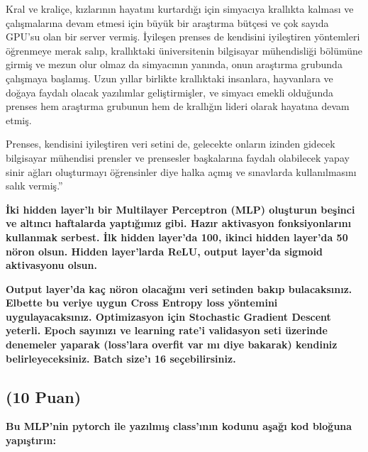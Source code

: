 \documentclass[11pt]{article}
\begin{document}
Kral ve kraliçe, kızlarının hayatını kurtardığı için simyacıya krallıkta kalması ve çalışmalarına devam etmesi için büyük bir araştırma bütçesi ve çok sayıda GPU'su olan bir server vermiş. İyileşen prenses de kendisini iyileştiren yöntemleri öğrenmeye merak salıp, krallıktaki üniversitenin bilgisayar mühendisliği bölümüne girmiş ve mezun olur olmaz da simyacının yanında, onun araştırma grubunda çalışmaya başlamış. Uzun yıllar birlikte krallıktaki insanlara, hayvanlara ve doğaya faydalı olacak yazılımlar geliştirmişler, ve simyacı emekli olduğunda prenses hem araştırma grubunun hem de krallığın lideri olarak hayatına devam etmiş.

Prenses, kendisini iyileştiren veri setini de, gelecekte onların izinden gidecek bilgisayar mühendisi prensler ve prensesler başkalarına faydalı olabilecek yapay sinir ağları oluşturmayı öğrensinler diye halka açmış ve sınavlarda kullanılmasını salık vermiş.''

\textbf{İki hidden layer'lı bir Multilayer Perceptron (MLP) oluşturun beşinci ve altıncı haftalarda yaptığımız gibi. Hazır aktivasyon fonksiyonlarını kullanmak serbest. İlk hidden layer'da 100, ikinci hidden layer'da 50 nöron olsun. Hidden layer'larda ReLU, output layer'da sigmoid aktivasyonu olsun.}

\textbf{Output layer'da kaç nöron olacağını veri setinden bakıp bulacaksınız. Elbette bu veriye uygun Cross Entropy loss yöntemini uygulayacaksınız. Optimizasyon için Stochastic Gradient Descent yeterli. Epoch sayınızı ve learning rate'i validasyon seti üzerinde denemeler yaparak (loss'lara overfit var mı diye bakarak) kendiniz belirleyeceksiniz. Batch size'ı 16 seçebilirsiniz.}



\subsection{(10 Puan)} \textbf{Bu MLP'nin pytorch ile yazılmış class'ının kodunu aşağı kod bloğuna yapıştırın:}
\end{document}
